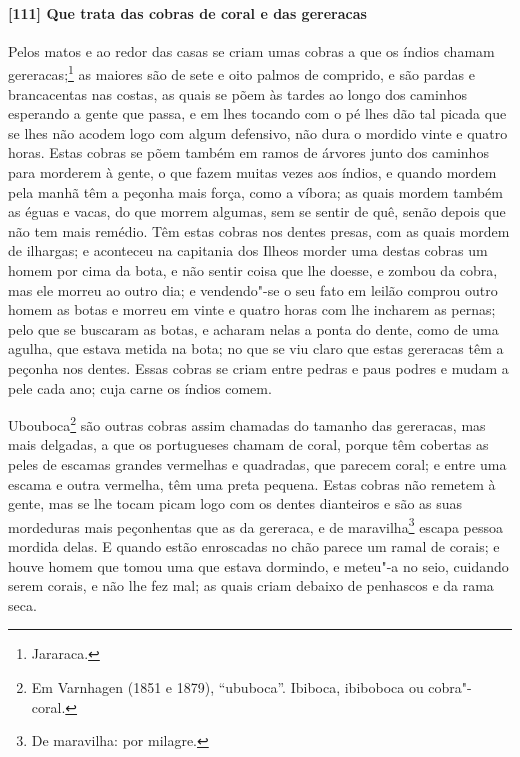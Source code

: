\begin{linenumbers}
\paragraph{[111] Que trata das cobras de coral e das gereracas}\quad
Pelos matos e ao redor das casas se criam umas cobras a que os índios chamam
gereracas;\footnote{ Jararaca.} as maiores são de sete e oito palmos de comprido, e são
pardas e brancacentas nas costas, as quais se põem às tardes ao longo dos caminhos
esperando a gente que passa, e em lhes tocando com o pé lhes dão tal picada que se lhes
não acodem logo com algum defensivo, não dura o mordido vinte e quatro horas. Estas cobras
se põem também em ramos de árvores junto dos caminhos para morderem à gente, o que fazem
muitas vezes aos índios, e quando mordem pela manhã têm a peçonha mais força, como a
víbora; as quais mordem também as éguas e vacas, do que morrem algumas, sem se sentir de
quê, senão depois que não tem mais remédio. Têm estas cobras nos dentes presas, com as
quais mordem de ilhargas; e aconteceu na capitania dos Ilheos morder uma destas cobras um
homem por cima da bota, e não sentir coisa que lhe doesse, e zombou da cobra, mas ele
morreu ao outro dia; e vendendo"-se o seu fato em leilão comprou outro homem as botas e
morreu em vinte e quatro horas com lhe incharem as pernas; pelo que se buscaram as botas, e
acharam nelas a ponta do dente, como de uma agulha, que estava metida na bota; no que se
viu claro que estas gereracas têm a peçonha nos dentes. Essas cobras se criam entre pedras
e paus podres e mudam a pele cada ano; cuja carne os índios comem.

Ubouboca\footnote{ Em Varnhagen (1851 e 1879), ``ububoca''. Ibiboca, ibiboboca ou
cobra"-coral.} são outras cobras assim chamadas do tamanho das gereracas, mas mais
delgadas, a que os portugueses chamam de coral, porque têm cobertas as peles de escamas
grandes vermelhas e quadradas, que parecem coral; e entre uma
escama e outra vermelha, têm uma preta pequena. Estas cobras não remetem à gente, mas se
lhe tocam picam logo com os dentes dianteiros e são as suas mordeduras mais peçonhentas
que as da gereraca, e de maravilha\footnote{ De maravilha: por milagre.} escapa pessoa
mordida delas. E quando estão enroscadas no chão parece um ramal de corais; e houve homem
que tomou uma que estava dormindo, e meteu"-a no seio, cuidando serem corais, e não lhe fez
mal; as quais criam debaixo de penhascos e da rama seca.


\end{linenumbers}

